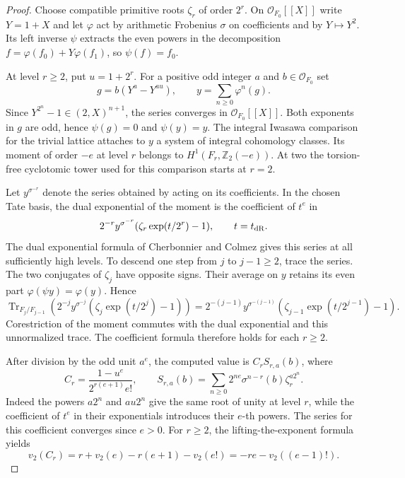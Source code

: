 \begin{proof}
Choose compatible primitive roots \(\zeta_r\) of order \(2^r\). On \(\mathcal O_{F_0}[[X]]\) write \(Y=1+X\) and let \(\varphi\) act by arithmetic Frobenius \(\sigma\) on coefficients and by \(Y\mapsto Y^2\). Its left inverse \(\psi\) extracts the even powers in the decomposition \(f=\varphi(f_0)+Y\varphi(f_1)\), so \(\psi(f)=f_0\).

At level \(r\ge2\), put \(u=1+2^r\). For a positive odd integer \(a\) and \(b\in\mathcal O_{F_0}\) set
\[
    g=b(Y^a-Y^{au}),\qquad y=\sum_{n\ge0}\varphi^n(g).
\]
Since \(Y^{2^n}-1\in(2,X)^{n+1}\), the series converges in \(\mathcal O_{F_0}[[X]]\). Both exponents in \(g\) are odd, hence \(\psi(g)=0\) and \(\psi(y)=y\). The integral Iwasawa comparison for the trivial lattice attaches to \(y\) a system of integral cohomology classes. Its moment of order \(-e\) at level \(r\) belongs to \(H^1(F_r,\mathbb Z_2(-e))\). At two the torsion-free cyclotomic tower used for this comparison starts at \(r=2\). \cite[Proposition~II.1.2 and Theorem~II.1.3]{cherbonnier-colmez-iwasawa}

Let \(y^{\sigma^{-r}}\) denote the series obtained by acting on its coefficients. In the chosen Tate basis, the dual exponential of the moment is the coefficient of \(t^e\) in
\[
   2^{-r}y^{\sigma^{-r}}(\zeta_r\exp(t/2^r)-1),\qquad t=t_{\rm dR}.
\]
The dual exponential formula of Cherbonnier and Colmez gives this series at all sufficiently high levels. To descend one step from \(j\) to \(j-1\ge2\), trace the series. The two conjugates of \(\zeta_j\) have opposite signs. Their average on \(y\) retains its even part \(\varphi(\psi y)=\varphi(y)\). Hence
\[
 \operatorname{Tr}_{F_j/F_{j-1}}\!
     \left(2^{-j}y^{\sigma^{-j}}(\zeta_j\exp(t/2^j)-1)\right)
 =2^{-(j-1)}y^{\sigma^{-(j-1)}}(\zeta_{j-1}\exp(t/2^{j-1})-1).
\]
Corestriction of the moment commutes with the dual exponential and this unnormalized trace. The coefficient formula therefore holds for each \(r\ge2\). \cite[Theorem~IV.2.1 and its proof]{cherbonnier-colmez-iwasawa}

After division by the odd unit \(a^e\), the computed value is \(C_r S_{r,a}(b)\), where
\[
 C_r=\frac{1-u^e}{2^{r(e+1)}e!},\qquad
 S_{r,a}(b)=\sum_{n\ge0}2^{ne}\sigma^{n-r}(b)\zeta_r^{a2^n}.
\]
Indeed the powers \(a2^n\) and \(au2^n\) give the same root of unity at level \(r\), while the coefficient of \(t^e\) in their exponentials introduces their \(e\)-th powers. The series for this coefficient converges since \(e>0\). For \(r\ge2\), the lifting-the-exponent formula yields
\[
    v_2(C_r)=r+v_2(e)-r(e+1)-v_2(e!)
            =-re-v_2((e-1)!).
\]


\end{proof}
